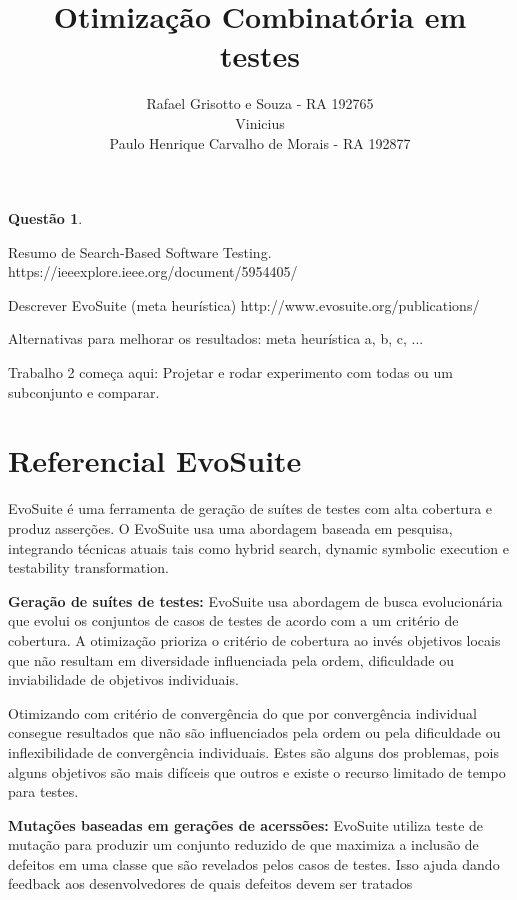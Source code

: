 \documentclass[12pt,a4paper]{article}
\title{Otimização Combinatória em  \\ testes}
\author{Rafael Grisotto e Souza - RA 192765\\ Vinicius \\ Paulo Henrique Carvalho de Morais - RA 192877}
\newtheorem{questao}{Questão}
\begin{document}
\maketitle


\begin{questao}
\end{questao}

Resumo de Search-Based Software Testing.
https://ieeexplore.ieee.org/document/5954405/

Descrever EvoSuite (meta heurística)
http://www.evosuite.org/publications/

Alternativas para melhorar os resultados: meta heurística a, b, c, ...


Trabalho 2 começa aqui:
\cite{arcuri2017restful}
Projetar e rodar experimento com todas ou um subconjunto e comparar.

\newpage
\listoftodos[Notes]



\newpage

\section{Referencial EvoSuite}

EvoSuite é uma ferramenta de geração de suítes de testes com alta cobertura e produz asserções. O EvoSuite usa uma abordagem baseada em pesquisa, integrando técnicas atuais tais como hybrid
search, dynamic symbolic execution e testability transformation. 

\textbf{Geração de suítes de testes:} EvoSuite usa abordagem de busca evolucionária que evolui os conjuntos de casos de testes de acordo com a um critério de cobertura. A otimização prioriza
o critério de cobertura ao invés objetivos locais que não resultam em diversidade influenciada pela ordem, dificuldade ou inviabilidade de objetivos individuais.

Otimizando com critério de convergência do que por convergência individual consegue resultados que não são influenciados pela ordem ou pela dificuldade ou inflexibilidade de convergência
individuais. Estes são alguns dos problemas, pois alguns objetivos são mais difíceis que outros e existe o recurso limitado de tempo para testes.

\textbf{Mutações baseadas em gerações de acerssões:} EvoSuite utiliza teste de mutação para produzir um conjunto reduzido de que maximiza a inclusão de defeitos em uma classe que são revelados pelos casos de testes. Isso ajuda dando feedback aos desenvolvedores de quais defeitos devem ser tratados 
\end{document}
